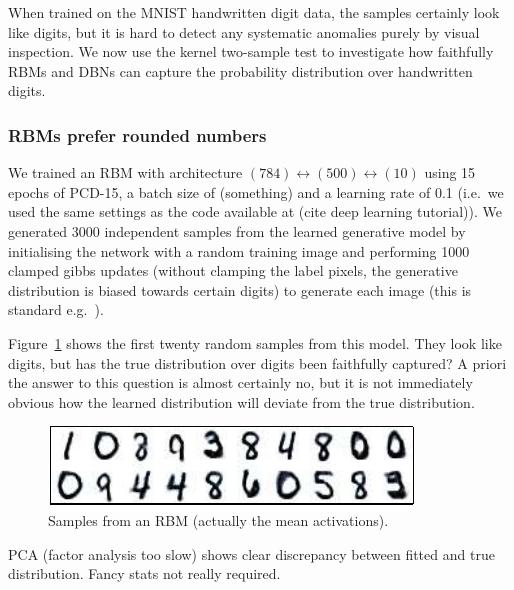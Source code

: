 \documentclass{article} %
\def\ie{i.e.\ }
\def\eg{e.g.\ }
\begin{document}
When trained on the MNIST handwritten digit data, the samples certainly look like digits, but it is hard to detect any systematic anomalies purely by visual inspection.
We now use the kernel two-sample test to investigate how faithfully RBMs and DBNs can capture the probability distribution over handwritten digits.

\subsubsection{RBMs prefer rounded numbers}

We trained an RBM with architecture $(784)\leftrightarrow(500)\leftrightarrow(10)$ using 15 epochs of PCD-15, a batch size of (something) and a learning rate of 0.1 (\ie we used the same settings as the code available at (cite deep learning tutorial)).
We generated 3000 independent samples from the learned generative model by initialising the network with a random training image and performing 1000 clamped gibbs updates (without clamping the label pixels, the generative distribution is biased towards certain digits) to generate each image (this is standard \eg \cite{Hinton2007}).

Figure~\ref{fig:rbm_samples} shows the first twenty random samples from this model.
They look like digits, but has the true distribution over digits been faithfully captured?
A priori the answer to this question is almost certainly no, but it is not immediately obvious how the learned distribution will deviate from the true distribution.

\begin{figure}[ht]
\centering
\includegraphics[width=0.98\columnwidth]{figures/rbm_samples}
\caption{
Samples from an RBM (actually the mean activations).
}
\label{fig:rbm_samples}
\end{figure}

PCA (factor analysis too slow) shows clear discrepancy between fitted and true distribution.
Fancy stats not really required.
\end{document}
